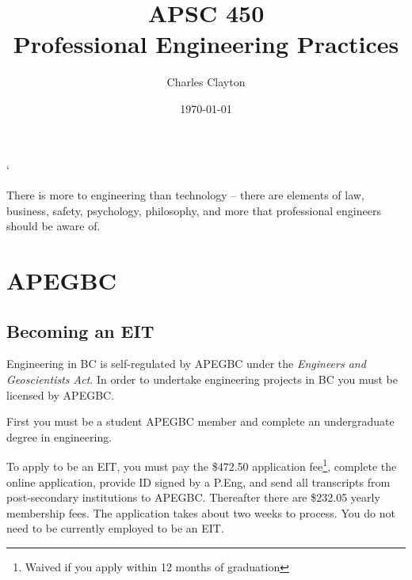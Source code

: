 \documentclass{article}
\begin{document}


\title{\huge APSC 450 \\ \Large \medskip Professional Engineering Practices}
\author{Charles Clayton}
\date{\today}
\maketitle
`
\thispagestyle{empty}

\setcounter{page}{0}



\singlespacing			\pagebreak
\tableofcontents		\pagebreak

\listoffigures		
\listoftables
\listofmyequations
\pagebreak



\printnoidxglossaries	\pagebreak





There is more to engineering than technology -- there are elements of law, business, safety, psychology, philosophy, and more that professional engineers should be aware of.

\section{APEGBC}

\subsection{Becoming an EIT}

Engineering in BC is self-regulated by APEGBC under the \textit{Engineers and Geoscientists Act}. In order to undertake engineering projects in BC you must be licensed by APEGBC.

First you must be a student APEGBC member and complete an undergraduate degree in engineering. 

To apply to be an EIT, you must pay the \$472.50 application fee\footnote{Waived if you apply within 12 months of graduation}, complete the online application, provide ID signed by a P.Eng, and send all transcripts from post-secondary institutions to APEGBC. Thereafter there are \$232.05 yearly membership fees. The application  takes about two weeks to process. You do not need to be currently employed to be an EIT.
\end{document}

